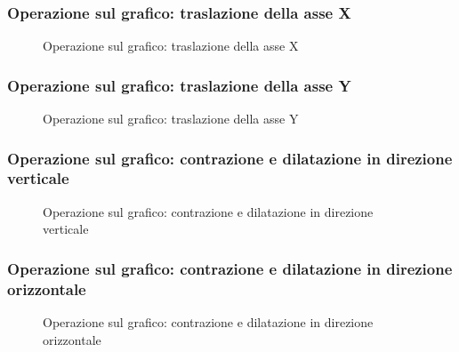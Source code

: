 \subsubsection{Operazione sul grafico: traslazione della asse X}
\begin{figure}[!ht]
	\centering
	\caption{Operazione sul grafico: traslazione della asse X}
\end{figure}
\subsubsection{Operazione sul grafico: traslazione della asse Y}
\begin{figure}[!ht]
	\centering
	\caption{Operazione sul grafico: traslazione della asse Y}
\end{figure}\newpage
\subsubsection{Operazione sul grafico: contrazione e dilatazione in direzione verticale}
\begin{figure}[!ht]
	\centering
	\caption{Operazione sul grafico: contrazione e dilatazione in direzione verticale}
\end{figure}
\subsubsection{Operazione sul grafico: contrazione e dilatazione in direzione
orizzontale}
\begin{figure}[!ht]
	\centering
	\caption{Operazione sul grafico: contrazione e dilatazione in direzione
	orizzontale}
\end{figure}\newpage
